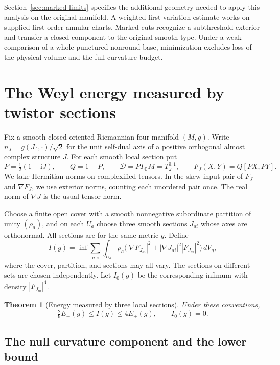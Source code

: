 \documentclass[11pt]{article}
\numberwithin{equation}{section}
\newtheorem{theorem}{Theorem}[section]
\theoremstyle{definition}
\theoremstyle{remark}
\begin{document}
Section~\ref{sec:marked-limits} specifies the additional geometry needed
to apply this analysis on the original manifold. A weighted
first-variation estimate works on supplied first-order annular
charts. Marked cuts recognize a subthreshold exterior and transfer a
closed component to the original smooth type. Under a weak comparison
of a whole punctured nonround base, minimization excludes loss of the
physical volume and the full curvature budget.

\section{The Weyl energy measured by twistor sections}
\label{sec:sections}

Fix a smooth closed oriented Riemannian four-manifold \((M,g)\).
Write \(n_J=g(J\,\cdot,\cdot)/\sqrt 2\) for the unit self-dual axis of
a positive orthogonal almost complex structure \(J\). For each smooth local section
put
\[
 P=\tfrac12(1+\mathrm iJ),\qquad Q=1-P,\qquad
 \mathcal D=P T_{\mathbb C}M=T^{0,1}_J,\qquad F_J(X,Y)=Q[PX,PY].
\]
We take Hermitian norms on complexified tensors. In the skew input pair
of \(F_J\) and \(\nabla F_J\), we use exterior norms, counting each
unordered pair once. The real norm of \(\nabla J\) is the usual tensor
norm.

Choose a finite open cover with a smooth nonnegative subordinate
partition of unity \((\rho_a)\), and on each \(U_a\) choose three smooth
sections \(J_{ai}\) whose axes are orthonormal. All sections are for the
same metric \(g\). Define
\begin{equation}
 \label{secjet:energy}
 I(g)=\inf\sum_{a,i}\int_{U_a}\rho_a
   \bigl(|\nabla F_{J_{ai}}|^2+|\nabla J_{ai}|^2|F_{J_{ai}}|^2\bigr)
 \,dV_g ,
\end{equation}
where the cover, partition, and sections may all vary. The sections on
different sets are chosen independently. Let \(I_0(g)\) be the
corresponding infimum with density \(|F_{J_{ai}}|^4\).

\begin{theorem}[Energy measured by three local sections]
 \label{secjet:comparison}
 Under these conventions,
 \[
      \tfrac29 E_+(g)\le I(g)\le 4E_+(g),\qquad I_0(g)=0 .
 \]
\end{theorem}

\subsection{The null curvature component and the lower bound}
\end{document}
